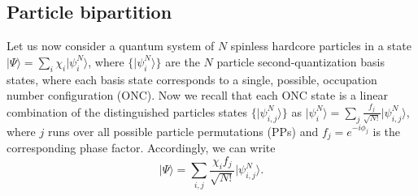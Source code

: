 \subsection{Particle bipartition}
\label{sec:Particle_bipartition}
Let us now consider a quantum system of $N$ spinless hardcore particles in a
state $\vert \Psi\rangle=\sum_i\chi_i \vert \psi^N_i\rangle$, where $\{\vert
\psi^N_i\rangle\}$ are the $N$ particle second-quantization basis states, where
each basis state corresponds to a single, possible, occupation number
configuration (ONC). Now we recall that each ONC state is a linear combination
of the distinguished particles states $\{\vert \psi^N_{i,j}\rangle\}$ as $\vert
\psi^N_i\rangle=\sum_j\frac{f_j}{\sqrt{N!}}\vert \psi^N_{i,j}\rangle$, where
$j$ runs over all  possible particle permutations (PPs) and $f_j=e^{-i\phi_j}$ is
the corresponding phase factor. Accordingly, we can write 
%
\begin{equation}
\vert \Psi\rangle=\sum_{i,j}\frac{\chi_if_j}{\sqrt{N!}}\vert \psi^N_{i,j}\rangle.
\label{Psi_pprho_1and2_star}
\end{equation}
%

